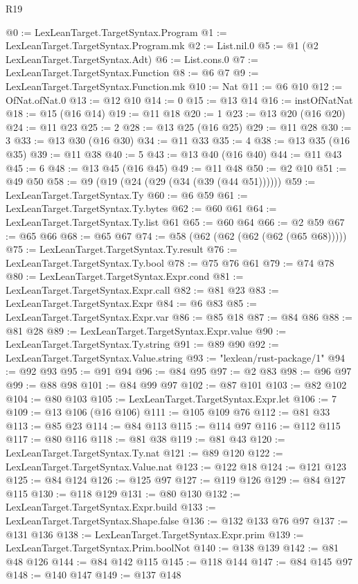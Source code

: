 \begin{lexlean}{R19}
\begin{coremodule}
{{{{{{{{{{{{{{{{{{{{{{{{{{{{{{{{{{{{{{{{{{{{{{{{{{{{{{{{{{{{{{{{{{{{{{{{{{{{{{{{{{{{{{{@0 := LexLeanTarget.TargetSyntax.Program
@1 := LexLeanTarget.TargetSyntax.Program.mk
@2 := List.nil.{0}
@5 := @1 (@2 LexLeanTarget.TargetSyntax.Adt)
@6 := List.cons.{0}
@7 := LexLeanTarget.TargetSyntax.Function
@8 := @6 @7
@9 := LexLeanTarget.TargetSyntax.Function.mk
@10 := Nat
@11 := @6 @10
@12 := OfNat.ofNat.{0}
@13 := @12 @10
@14 := 0
@15 := @13 @14
@16 := instOfNatNat
@18 := @15 (@16 @14)
@19 := @11 @18
@20 := 1
@23 := @13 @20 (@16 @20)
@24 := @11 @23
@25 := 2
@28 := @13 @25 (@16 @25)
@29 := @11 @28
@30 := 3
@33 := @13 @30 (@16 @30)
@34 := @11 @33
@35 := 4
@38 := @13 @35 (@16 @35)
@39 := @11 @38
@40 := 5
@43 := @13 @40 (@16 @40)
@44 := @11 @43
@45 := 6
@48 := @13 @45 (@16 @45)
@49 := @11 @48
@50 := @2 @10
@51 := @49 @50
@58 := @9 (@19 (@24 (@29 (@34 (@39 (@44 @51))))))
@59 := LexLeanTarget.TargetSyntax.Ty
@60 := @6 @59
@61 := LexLeanTarget.TargetSyntax.Ty.bytes
@62 := @60 @61
@64 := LexLeanTarget.TargetSyntax.Ty.list @61
@65 := @60 @64
@66 := @2 @59
@67 := @65 @66
@68 := @65 @67
@74 := @58 (@62 (@62 (@62 (@62 (@65 @68)))))
@75 := LexLeanTarget.TargetSyntax.Ty.result
@76 := LexLeanTarget.TargetSyntax.Ty.bool
@78 := @75 @76 @61
@79 := @74 @78
@80 := LexLeanTarget.TargetSyntax.Expr.cond
@81 := LexLeanTarget.TargetSyntax.Expr.call
@82 := @81 @23
@83 := LexLeanTarget.TargetSyntax.Expr
@84 := @6 @83
@85 := LexLeanTarget.TargetSyntax.Expr.var
@86 := @85 @18
@87 := @84 @86
@88 := @81 @28
@89 := LexLeanTarget.TargetSyntax.Expr.value
@90 := LexLeanTarget.TargetSyntax.Ty.string
@91 := @89 @90
@92 := LexLeanTarget.TargetSyntax.Value.string
@93 := "lexlean/rust-package/1"
@94 := @92 @93
@95 := @91 @94
@96 := @84 @95
@97 := @2 @83
@98 := @96 @97
@99 := @88 @98
@101 := @84 @99 @97
@102 := @87 @101
@103 := @82 @102
@104 := @80 @103
@105 := LexLeanTarget.TargetSyntax.Expr.let
@106 := 7
@109 := @13 @106 (@16 @106)
@111 := @105 @109 @76
@112 := @81 @33
@113 := @85 @23
@114 := @84 @113
@115 := @114 @97
@116 := @112 @115
@117 := @80 @116
@118 := @81 @38
@119 := @81 @43
@120 := LexLeanTarget.TargetSyntax.Ty.nat
@121 := @89 @120
@122 := LexLeanTarget.TargetSyntax.Value.nat
@123 := @122 @18
@124 := @121 @123
@125 := @84 @124
@126 := @125 @97
@127 := @119 @126
@129 := @84 @127 @115
@130 := @118 @129
@131 := @80 @130
@132 := LexLeanTarget.TargetSyntax.Expr.build
@133 := LexLeanTarget.TargetSyntax.Shape.false
@136 := @132 @133 @76 @97
@137 := @131 @136
@138 := LexLeanTarget.TargetSyntax.Expr.prim
@139 := LexLeanTarget.TargetSyntax.Prim.boolNot
@140 := @138 @139
@142 := @81 @48 @126
@144 := @84 @142 @115
@145 := @118 @144
@147 := @84 @145 @97
@148 := @140 @147
@149 := @137 @148
}}}}}}}}}}}}}}}}}}}}}}}}}}}}}}}}}}}}}}}}}}}}}}}}}}}}}}}}}}}}}}}}}}}}}}}}}}}}}}}}}}}}}}}
\end{coremodule}
\end{lexlean}
